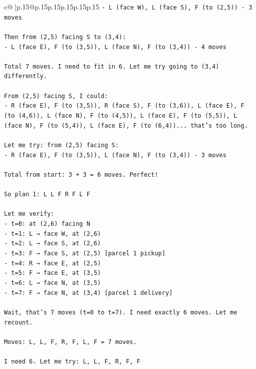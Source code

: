 \documentclass{article}
\begin{document}
{\begin{supertabular}{c@{$\;$}|p{.15\linewidth}@{}p{.15\linewidth}p{.15\linewidth}p{.15\linewidth}p{.15\linewidth}p{.15\linewidth}}
{{{\texttt{{-} L (face W), L (face S), F (to (2,5)) {-} 3 moves} \\
\\ 
\texttt{Then from (2,5) facing S to (3,4):} \\
\texttt{{-} L (face E), F (to (3,5)), L (face N), F (to (3,4)) {-} 4 moves} \\
\\ 
\texttt{Total 7 moves. I need to fit in 6. Let me try going to (3,4) differently.} \\
\\ 
\texttt{From (2,5) facing S, I could:} \\
\texttt{{-} R (face E), F (to (3,5)), R (face S), F (to (3,6)), L (face E), F (to (4,6)), L (face N), F (to (4,5)), L (face E), F (to (5,5)), L (face N), F (to (5,4)), L (face E), F (to (6,4))... that's too long.} \\
\\ 
\texttt{Let me try: from (2,5) facing S:} \\
\texttt{{-} R (face E), F (to (3,5)), L (face N), F (to (3,4)) {-} 3 moves} \\
\\ 
\texttt{Total from start: 3 + 3 = 6 moves. Perfect!} \\
\\ 
\texttt{So plan 1: L L F R F L F} \\
\\ 
\texttt{Let me verify:} \\
\texttt{{-} t=0: at (2,6) facing N} \\
\texttt{{-} t=1: L → face W, at (2,6)} \\
\texttt{{-} t=2: L → face S, at (2,6)} \\
\texttt{{-} t=3: F → face S, at (2,5) {[}parcel 1 pickup{]}} \\
\texttt{{-} t=4: R → face E, at (2,5)} \\
\texttt{{-} t=5: F → face E, at (3,5)} \\
\texttt{{-} t=6: L → face N, at (3,5)} \\
\texttt{{-} t=7: F → face N, at (3,4) {[}parcel 1 delivery{]}} \\
\\ 
\texttt{Wait, that's 7 moves (t=0 to t=7). I need exactly 6 moves. Let me recount.} \\
\\ 
\texttt{Moves: L, L, F, R, F, L, F = 7 moves.} \\
\\ 
\texttt{I need 6. Let me try: L, L, F, R, F, F} \\
}}}
\end{supertabular}}
\end{document}
